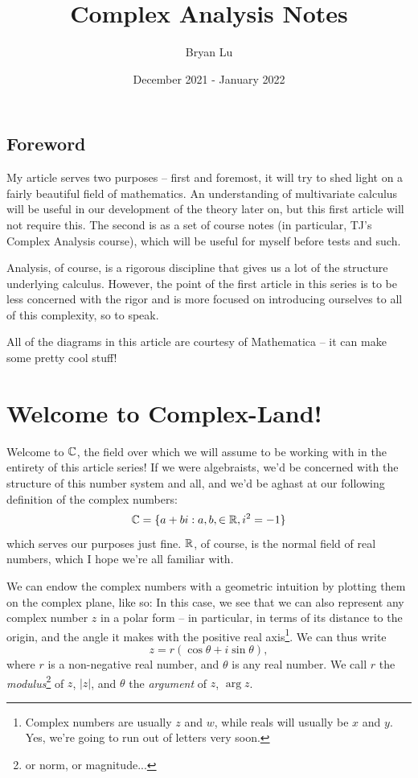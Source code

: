 \documentclass[12pt]{scrartcl}
\title{Complex Analysis Notes}
\author{Bryan Lu}
\date{December 2021 - January 2022} %
\begin{document}
\maketitle

\subsection{Foreword}
My article serves two purposes -- first and foremost, it will try to shed light on a fairly beautiful field of mathematics. An understanding of multivariate calculus will be useful in our development of the theory later on, but this first article will not require this. The second is as a set of course notes (in particular, TJ's Complex Analysis course), which will be useful for myself before tests and such.

Analysis, of course, is a rigorous discipline that gives us a lot of the structure underlying calculus. However, the point of the first article in this series is to be less concerned with the rigor and is more focused on introducing ourselves to all of this complexity, so to speak.

All of the diagrams in this article are courtesy of Mathematica -- it can make some pretty cool stuff!

\section{Welcome to Complex-Land!}
Welcome to $\mathbb C$, the field over which we will assume to be working with in the entirety of this article series! If we were algebraists, we'd be concerned with the structure of this number system and all, and we'd be aghast at our following definition of the complex numbers:
\[
	\mathbb C = \{ a + b i : a, b, \in \mathbb R, i^2 = -1\}
\]
which serves our purposes just fine. $\mathbb R$, of course, is the normal field of real numbers, which I hope we're all familiar with.

We can endow the complex numbers with a geometric intuition by plotting them on the complex plane, like so:
In this case, we see that we can also represent any complex number $z$ in a polar form -- in particular, in terms of its distance to the origin, and the angle it makes with the positive real axis\footnote{Complex numbers are usually $z$ and $w$, while reals will usually be $x$ and $y$. Yes, we're going to run out of letters very soon.}. We can thus write
\[
	z = r (\cos \theta + i \sin \theta),
\]
where $r$ is a non-negative real number, and $\theta$ is any real number. We call $r$ the \textit{modulus}\footnote{or norm, or magnitude...} of $z$, $|z|$, and $\theta$ the \textit{argument} of $z$, $\arg z$.
\end{document}
